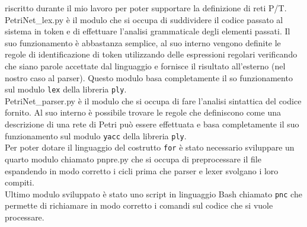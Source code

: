 \documentclass[italian,12pt]{report}
\begin{document}
 riscritto durante il mio lavoro per poter supportare la definizione di reti P/T. \\
 PetriNet\_lex.py è il modulo che si occupa di suddividere il codice passato al sistema in 
 token e di effettuare l'analisi grammaticale degli elementi passati. 
 Il suo funzionamento è abbastanza semplice, al suo interno vengono definite le regole di 
 identificazione di token utilizzando delle espressioni regolari verificando che siano parole
 accettate dal linguaggio e fornisce il risultato all'esterno (nel nostro caso al parser). 
 Questo modulo basa completamente il so funzionamento sul modulo {\tt lex} della libreria {\tt ply}. \\
 PetriNet\_parser.py è il modulo che si occupa di fare l'analisi sintattica del codice fornito.
 Al suo interno è possibile trovare le regole che definiscono come una descrizione di una rete di 
 Petri può essere effettuata e basa completamente il suo funzionamento sul modulo {\tt yacc} della
 libreria {\tt ply}. \\
 Per poter dotare il linguaggio del costrutto {\tt for} è stato necessario sviluppare un quarto
 modulo chiamato pnpre.py che si occupa di preprocessare il file espandendo in modo corretto 
 i cicli prima che parser e lexer svolgano i loro compiti. \\
 Ultimo modulo sviluppato è stato uno script in linguaggio Bash chiamato {\tt pnc} che permette di 
 richiamare in modo corretto i comandi sul codice che si vuole processare.\\ 
\end{document}
